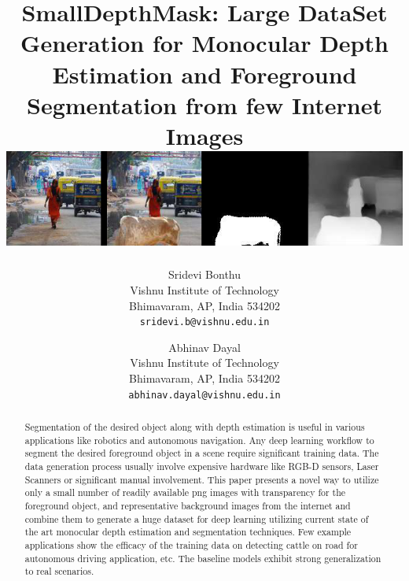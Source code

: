 \documentclass[review]{cvpr}
\begin{document}
\title{SmallDepthMask: Large DataSet Generation for Monocular Depth Estimation and Foreground Segmentation from few Internet Images
\includegraphics[width=1\textwidth]{samplerecord.png}
}

\author{Sridevi Bonthu\\
Vishnu Institute of Technology\\
Bhimavaram, AP, India 534202\\
{\tt\small sridevi.b@vishnu.edu.in}
\and
Abhinav Dayal\\
Vishnu Institute of Technology\\
Bhimavaram, AP, India 534202\\
{\tt\small abhinav.dayal@vishnu.edu.in}
}

\maketitle

\begin{abstract}
  Segmentation of the desired object along with depth estimation is useful in various applications like robotics and autonomous navigation. 
  Any deep learning workflow to segment the desired foreground object in a scene require significant training data.
  The data generation process usually involve expensive hardware like RGB-D sensors, Laser Scanners or significant manual involvement. 
  This paper presents a novel way to utilize only a small number of readily available png images with transparency for the foreground object, 
  and representative background images from the internet and combine them to generate a huge dataset for deep learning
  utilizing current state of the art monocular depth estimation and segmentation techniques. 
  Few example applications show the efficacy of the training data on detecting 
  cattle on road for autonomous driving application, etc. The baseline models exhibit strong generalization to real scenarios.
\end{abstract}
\end{document}
